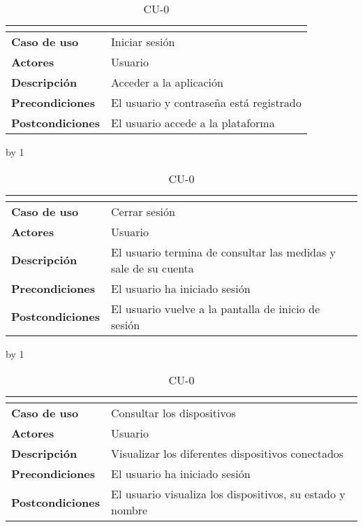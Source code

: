 \begin{table}[H]
	\centering
	\caption{CU-0\number\cu}
	\begin{tabular}{|l|p{}|}
		\hline
		\multicolumn{2}{|c|}{\cellcolor[HTML]{BFBFBF}{\color[HTML]{000000} \textbf{CU-0\number\cu}}} \\ \hline
		\textbf{Caso de uso}     & Iniciar sesión                          \\ \hline
		\textbf{Actores}         & Usuario                                 \\ \hline
		\textbf{Descripción}     & Acceder a la aplicación                 \\ \hline
		\textbf{Precondiciones}  & El usuario y contraseña está registrado \\ \hline
		\textbf{Postcondiciones} & El usuario accede a la plataforma       \\ \hline
	\end{tabular}
\end{table}
\advance\cu by 1
\begin{table}[H]
	\centering
	\caption{CU-0\number\cu}
	\begin{tabular}{|l|p{}|}
		\hline
		\multicolumn{2}{|c|}{\cellcolor[HTML]{BFBFBF}{\color[HTML]{000000} \textbf{CU-0\number\cu}}} \\ \hline
		\textbf{Caso de uso}     & Cerrar sesión                                                   \\ \hline
		\textbf{Actores}         & Usuario                                                         \\ \hline
		\textbf{Descripción}     & El usuario termina de consultar las medidas y sale de su cuenta \\ \hline
		\textbf{Precondiciones}  & El usuario ha iniciado sesión                                   \\ \hline
		\textbf{Postcondiciones} & El usuario vuelve a la pantalla de inicio de sesión             \\ \hline
	\end{tabular}
\end{table}
\advance\cu by 1
\begin{table}[H]
	\centering
	\caption{CU-0\number\cu}
	\begin{tabular}{|l|p{}|}
		\hline
		\multicolumn{2}{|c|}{\cellcolor[HTML]{BFBFBF}{\color[HTML]{000000} \textbf{CU-0\number\cu}}} \\ \hline
		\textbf{Caso de uso}     & Consultar los dispositivos                                \\ \hline
		\textbf{Actores}         & Usuario                                                   \\ \hline
		\textbf{Descripción}     & Visualizar los diferentes dispositivos conectados         \\ \hline
		\textbf{Precondiciones}  & El usuario ha iniciado sesión                             \\ \hline
		\textbf{Postcondiciones} & El usuario visualiza los dispositivos, su estado y nombre \\ \hline
	\end{tabular}
\end{table}
